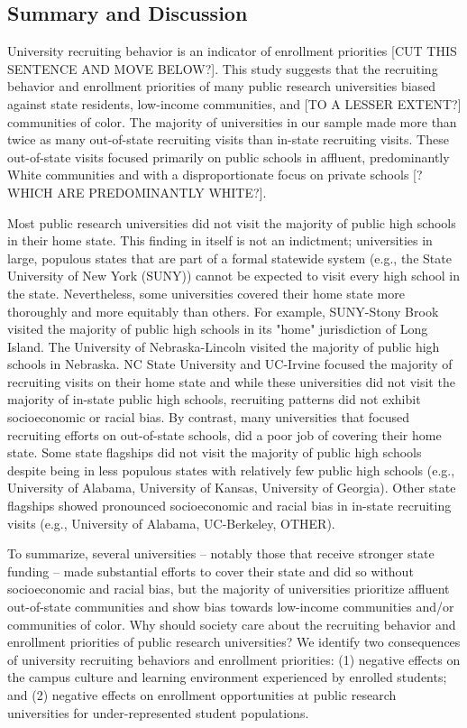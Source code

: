 \documentclass[twoside]{article}
\begin{document}
\subsection*{Summary and Discussion}
University recruiting behavior is an indicator of enrollment priorities [CUT THIS SENTENCE AND MOVE BELOW?].  This study suggests that the recruiting behavior and enrollment priorities of many public research universities biased against state residents, low-income communities, and [TO A LESSER EXTENT?] communities of color.  The majority of universities in our sample made more than twice as many out-of-state recruiting visits than in-state recruiting visits.  These out-of-state visits focused primarily on public schools in affluent, predominantly White communities and with a disproportionate focus on private schools [? WHICH ARE PREDOMINANTLY WHITE?].  

Most public research universities did not visit the majority of public high schools in their home state. This finding in itself is not an indictment; universities in large, populous states that are part of a formal statewide system (e.g., the State University of New York (SUNY)) cannot be expected to visit every high school in the state. Nevertheless, some universities covered their home state more thoroughly and more equitably than others.  For example, SUNY-Stony Brook visited the majority of public high schools in its "home" jurisdiction of Long Island. The University of Nebraska-Lincoln visited the majority of public high schools in Nebraska.  NC State University and UC-Irvine focused the majority of recruiting visits on their home state and while these universities did not visit the majority of in-state public high schools, recruiting patterns did not exhibit socioeconomic or racial bias.  By contrast, many universities that focused recruiting efforts on out-of-state schools, did a poor job of covering their home state. Some state flagships did not visit the majority of public high schools despite being in less populous states with relatively few public high schools (e.g., University of Alabama, University of Kansas, University of Georgia).  Other state flagships showed pronounced socioeconomic and racial bias in in-state recruiting visits (e.g., University of Alabama, UC-Berkeley, OTHER).  

To summarize, several universities -- notably those that receive stronger state funding -- made substantial efforts to cover their state and did so without socioeconomic and racial bias, but the majority of universities prioritize affluent out-of-state communities and show bias towards low-income communities and/or communities of color. Why should society care about the recruiting behavior and enrollment priorities of public research universities? We identify two consequences of university recruiting behaviors and enrollment priorities: (1) negative effects on the campus culture and learning environment experienced by enrolled students; and (2) negative effects on enrollment opportunities at public research universities for under-represented student populations.
\end{document}
